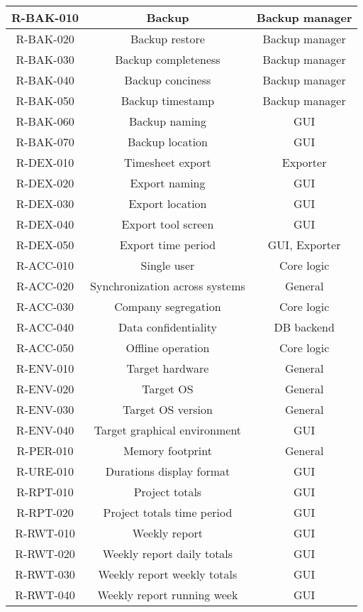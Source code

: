 \begin{longtable}{| c | c | c |}
  R-BAK-010 & Backup & Backup manager \\ \hline
  R-BAK-020 & Backup restore & Backup manager \\ \hline
  R-BAK-030 & Backup completeness & Backup manager \\ \hline
  R-BAK-040 & Backup conciness & Backup manager \\ \hline
  R-BAK-050 & Backup timestamp & Backup manager \\ \hline
  R-BAK-060 & Backup naming & GUI \\ \hline
  R-BAK-070 & Backup location & GUI \\ \hline
  R-DEX-010 & Timesheet export & Exporter \\ \hline
  R-DEX-020 & Export naming & GUI \\ \hline
  R-DEX-030 & Export location & GUI \\ \hline
  R-DEX-040 & Export tool screen & GUI \\ \hline
  R-DEX-050 & Export time period & GUI, Exporter \\ \hline
  R-ACC-010 & Single user & Core logic \\ \hline
  R-ACC-020 & Synchronization across systems & General \\ \hline
  R-ACC-030 & Company segregation & Core logic \\ \hline
  R-ACC-040 & Data confidentiality & DB backend \\ \hline
  R-ACC-050 & Offline operation & Core logic \\ \hline
  R-ENV-010 & Target hardware & General \\ \hline
  R-ENV-020 & Target OS & General \\ \hline
  R-ENV-030 & Target OS version & General \\ \hline
  R-ENV-040 & Target graphical environment & GUI \\ \hline
  R-PER-010 & Memory footprint & General \\ \hline
  R-URE-010 & Durations display format & GUI \\ \hline
  R-RPT-010 & Project totals & GUI \\ \hline
  R-RPT-020 & Project totals time period & GUI \\ \hline
  R-RWT-010 & Weekly report & GUI \\ \hline
  R-RWT-020 & Weekly report daily totals & GUI \\ \hline
  R-RWT-030 & Weekly report weekly totals & GUI \\ \hline
  R-RWT-040 & Weekly report running week & GUI \\ \hline

\end{longtable}
